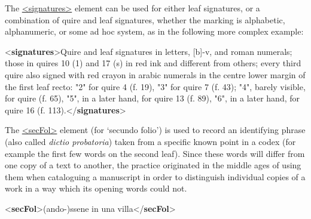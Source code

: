 The \hyperref[TEI.signatures]{<signatures>} element can be used for either leaf signatures, or a combination of quire and leaf signatures, whether the marking is alphabetic, alphanumeric, or some ad hoc system, as in the following more complex example: \par\bgroup{}\exampleFont \begin{shaded}\noindent\mbox{}{<\textbf{signatures}>}Quire and leaf\mbox{}\newline 
 signatures in letters, [b]-v, and roman numerals; those in quires 10 (1) and 17\mbox{}\newline 
 (s) in red ink and different from others; every third quire also signed with red\mbox{}\newline 
 crayon in arabic numerals in the centre lower margin of the first leaf recto:\mbox{}\newline 
 "2" for quire 4 (f. 19), "3" for quire 7 (f. 43); "4", barely visible, for quire\mbox{} (f. 65), "5", in a later hand, for quire 13 (f. 89), "6", in a later hand,\mbox{}\newline 
 for quire 16 (f. 113).{</\textbf{signatures}>}\end{shaded}\egroup\par \par
The \hyperref[TEI.secFol]{<secFol>} element (for ‘secundo folio’) is used to record an identifying phrase (also called \textit{dictio probatoria}) taken from a specific known point in a codex (for example the first few words on the second leaf). Since these words will differ from one copy of a text to another, the practice originated in the middle ages of using them when cataloguing a manuscript in order to distinguish individual copies of a work in a way which its opening words could not. \par\bgroup{}\exampleFont \begin{shaded}\noindent\mbox{}{<\textbf{secFol}>}(ando-)ssene in una villa{</\textbf{secFol}>}\end{shaded}\egroup\par \noindent  
